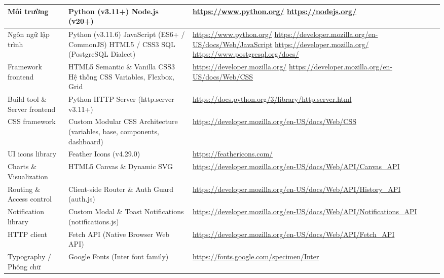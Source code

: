\begin{longtable}{|>{\raggedright\arraybackslash}p{3.4cm}|>{\raggedright\arraybackslash}p{5.2cm}|>{\raggedright\arraybackslash}p{6.6cm}|}
    Môi trường & Python (v3.11+) \newline Node.js (v20+) & \url{https://www.python.org/} \newline \url{https://nodejs.org/} \\ \hline
    Ngôn ngữ lập trình & Python (v3.11.6) \newline JavaScript (ES6+ / CommonJS) \newline HTML5 / CSS3 \newline SQL (PostgreSQL Dialect) & \url{https://www.python.org/} \newline \url{https://developer.mozilla.org/en-US/docs/Web/JavaScript} \newline \url{https://developer.mozilla.org/} \newline \url{https://www.postgresql.org/docs/} \\ \hline
    Framework frontend & HTML5 Semantic \& Vanilla CSS3 \newline Hệ thống CSS Variables, Flexbox, Grid & \url{https://developer.mozilla.org/} \newline \url{https://developer.mozilla.org/en-US/docs/Web/CSS} \\ \hline
    Build tool \& Server frontend & Python HTTP Server (http.server v3.11+) & \url{https://docs.python.org/3/library/http.server.html} \\ \hline
    CSS framework & Custom Modular CSS Architecture (variables, base, components, dashboard) & \url{https://developer.mozilla.org/en-US/docs/Web/CSS} \\ \hline
    UI icons library & Feather Icons (v4.29.0) & \url{https://feathericons.com/} \\ \hline
    Charts \& Visualization & HTML5 Canvas \& Dynamic SVG & \url{https://developer.mozilla.org/en-US/docs/Web/API/Canvas_API} \\ \hline
    Routing \& Access control & Client-side Router \& Auth Guard (auth.js) & \url{https://developer.mozilla.org/en-US/docs/Web/API/History_API} \\ \hline
    Notification library & Custom Modal \& Toast Notifications (notifications.js) & \url{https://developer.mozilla.org/en-US/docs/Web/API/Notifications_API} \\ \hline
    HTTP client & Fetch API (Native Browser Web API) & \url{https://developer.mozilla.org/en-US/docs/Web/API/Fetch_API} \\ \hline
    Typography / Phông chữ & Google Fonts (Inter font family) & \url{https://fonts.google.com/specimen/Inter} \\ \hline

\end{longtable}
